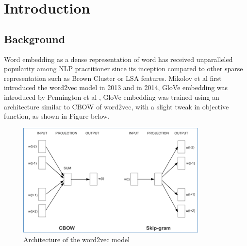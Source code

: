 
\chapter{Introduction} %
\label{ch:1_intro} %


\section{Background}


Word embedding as a dense representation of word has received unparalleled popularity among NLP practitioner since its inception compared to other sparse representation such as Brown Cluster or LSA features. Mikolov et al first introduced the word2vec model in 2013 \cite{mikolov2013efficient} and in 2014, GloVe embedding was introduced by Pennington et al \cite{pennington-etal-2014-glove}, GloVe embedding was trained using an architecture similar to CBOW of word2vec, with a slight tweak in objective function, as shown in Figure  below. 

\begin{figure}[htbp]
  \centering
    \includegraphics[width=0.85\textwidth]{Figures/Chapter1/word2vec_diagram.png}
  \caption{Architecture of the word2vec model}
  \label{fig:word2vec}
\end{figure}

